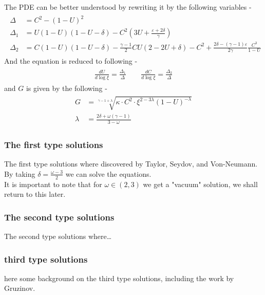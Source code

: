 \documentclass{article}
\begin{document}
The PDE can be better understood by rewriting it by the following variables - 
\begin{align}
    \label{eq:charcteristics}
    \begin{split}
        \Delta &= C^{2} - (1-U)^{2} \\
        \Delta_{1} &= U(1-U)(1-U-\delta) - C^{2}(3U + \frac{\varepsilon+2\delta}{\gamma}) \\
        \Delta_{2} &= C(1-U)(1-U-\delta) - \frac{\gamma-1}{2}CU(2-2U+\delta) - C^{2} + \frac{2\delta-(\gamma-1)\varepsilon}{2\gamma}\frac{C^{3}}{1-U}
    \end{split}
\end{align}
And the equation is reduced to following -
\begin{align}
    \begin{split}
        \frac{dU}{d\log\xi} = \frac{\Delta_{1}}{\Delta} \quad \quad
        \frac{dC}{d\log\xi} = \frac{\Delta_{2}}{\Delta}
    \end{split}
\end{align}
and $G$ is given by the following - 
\begin{align}
    \label{eq:G_(U,C)}
    \begin{split} 
    G &=\sqrt[\gamma-1+\lambda]{\kappa\cdot C^{2}\cdot\xi^{2-3\lambda}\left(1-U\right)^{-\lambda}}\\
    \lambda &=\frac{2\delta+\omega\left(\gamma-1\right)}{3-\omega}
    \end{split}
\end{align}
\subsubsection{The first type solutions}
The first type solutions where discovered by Taylor, Seydov, and Von-Neumann. 
By taking $\delta = \frac{\omega - 3}{2}$ we can solve the equations.\\
It is important to note that for $\omega \in \left(2,3\right)$ we get a "vacuum" solution, we shall return to this later.\\
\subsubsection{The second type solutions}
The second type solutions where\dots
 
\subsubsection{third type solutions}
here some background on the third type solutions, including the work by Gruzinov.
\end{document}
